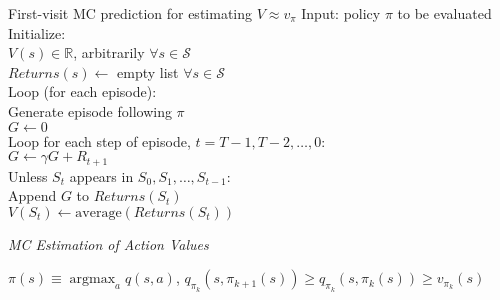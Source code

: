 \documentclass[twocolumn]{article}
\DeclareMathOperator*{\argmax}{argmax}
\begin{document}
\begin{mydef}{First-visit MC prediction for estimating $V \approx v_\pi$}{}
    Input: policy $\pi$ to be evaluated \\

    Initialize: \\
        \hspace*{2em}$V(s) \in \mathbb R$, arbitrarily $\forall s \in \mathcal S$ \\
        \hspace*{2em}$Returns(s) \leftarrow$ empty list $\forall s \in \mathcal S$ \\

    Loop (for each episode): \\
        \hspace*{2em}Generate episode following $\pi$ \\
        \hspace*{2em}$G \leftarrow 0$ \\
        \hspace*{2em}Loop for each step of episode, $t = T-1, T-2, \dots, 0$: \\
            \hspace*{4em}$G \leftarrow \gamma G + R_{t+1}$ \\
            \hspace*{4em}Unless $S_t$ appears in $S_0, S_1, \dots, S_{t-1}$: \\
                \hspace*{6em}Append $G$ to $Returns(S_t)$ \\
                \hspace*{6em}$V(S_t) \leftarrow \text{average}(Returns(S_t))$
\end{mydef}

\dotfill

\textit{MC Estimation of Action Values}

$\pi(s) \equiv \argmax_a q(s,a)$, \hfill $q_{\pi_k}(s, \pi_{k+1}(s)) \geq q_{\pi_k}(s, \pi_k(s)) \geq v_{\pi_k}(s)$
\end{document}
